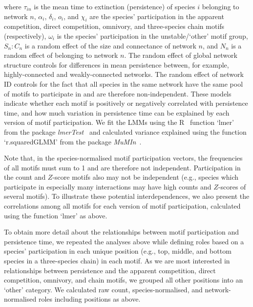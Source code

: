 \documentclass[12pt]{article}
\begin{document}
\begin{spacing}{2.0}
                where $\tau_{in}$ is the mean time to extinction (persistence) of species $i$ belonging to network $n$,  $\alpha_{i}$, $\delta_{i}$, $o_{i}$, and $\chi_{i}$ are the species' participation in the apparent competition, direct competition, omnivory, and three-species chain motifs (respectively), $\omega_{i}$ is the species' participation in the unstable/`other' motif group, $S_{n}:C_{n}$ is a random effect of the size and connectance of network $n$, and $N_n$ is a random effect of belonging to network $n$.
                The random effect of global network structure controls for differences in mean persistence between, for example, highly-connected and weakly-connected networks. 
                The random effect of network ID controls for the fact that all species in the same network have the same pool of motifs to participate in and are therefore non-independent.
                These models indicate whether each motif is positively or negatively correlated with persistence time, and how much variation in persistence time can be explained by each version of motif participation. 
                We fit the LMMs using the R~\citep{R} function `lmer' from the package \emph{lmerTest}~\citep{lmerTest} and calculated variance explained using the function `r.squaredGLMM' from the package \emph{MuMIn}~\citep{MuMIn}.
                
                
                Note that, in the species-normalised motif participation vectors, the frequencies of all motifs must sum to 1 and are therefore not independent. 
                Participation in the count and $Z$-score motifs also may not be independent (e.g., species which participate in especially many interactions may have high counts and $Z$-scores of several motifs).
                To illustrate these potential interdependences, we also present the correlations among all motifs for each version of motif participation, calculated using the function `lmer' as above.
                
                
                To obtain more detail about the relationships between motif participation and persistence time, we repeated the analyses above while defining roles based on a species' participation in each unique position (e.g., top, middle, and bottom species in a three-species chain) in each motif.
                As we are most interested in relationships between persistence and the apparent competition, direct competition, omnivory, and chain motifs, we grouped all other positions into an `other' category.
                We calculated raw count, species-normalised, and network-normalised roles including positions as above.
                


\end{spacing}
\end{document}
